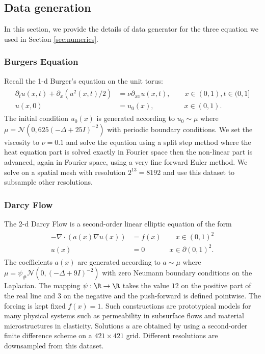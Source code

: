 \documentclass{article} %
\begin{document}
\subsection{Data generation}
In this section, we provide the details of data generator for the three equation we used in Section \ref{sec:numerics}.
\subsubsection{Burgers Equation}
\label{app:burgers}
Recall the 1-d Burger's equation on the unit torus:
\begin{align*}
    \begin{split}
    \partial_t u(x,t) + \partial_x ( u^2(x,t)/2) &= \nu \partial_{xx} u(x,t), \qquad x \in (0,1), t \in (0,1] \\
    u(x,0) &= u_0(x), \qquad \qquad \: x \in (0,1).
    \end{split}
\end{align*}
The initial condition $ u_0(x)$ is generated according to 
\(u_0 \sim \mu\) where \(\mu = \mathcal{N}(0,625(-\Delta + 25I)^{-2})\) with periodic boundary conditions. We set the viscosity to \(\nu = 0.1\) and solve the equation using a split step method where the heat equation part is solved exactly in Fourier space then the non-linear part is advanced, again in Fourier space, using a very fine forward Euler method. We solve on a spatial mesh with resolution $2^{13} = 8192$ and use this dataset to subsample other resolutions.

\subsubsection{Darcy Flow}
\label{app:darcy}
The 2-d Darcy Flow is a second-order linear elliptic equation of the form
\begin{align*}
\begin{split}
- \nabla \cdot (a(x) \nabla u(x)) &= f(x) \qquad x \in (0,1)^2 \\
u(x) &= 0 \qquad \quad \:\: x \in \partial (0,1)^2.
\end{split}
\end{align*}
The coefficients $a(x)$ are generated according to \(a \sim \mu \) where \(\mu = \psi_{\#} \mathcal{N}(0,(-\Delta + 9I)^{-2})\)
with zero Neumann boundary conditions on the Laplacian.
The mapping \(\psi : \R \to \R\) takes the value $12$ on the positive part of the real line and $3$ on the negative and the push-forward is defined pointwise. The forcing is kept fixed $f(x) = 1$. Such constructions are prototypical models for many physical systems such as permeability in subsurface flows and material microstructures in elasticity. Solutions \(u\) are obtained by using a second-order finite difference scheme on a $421 \times 421$ grid. Different resolutions are downsampled from this dataset. 
\end{document}
